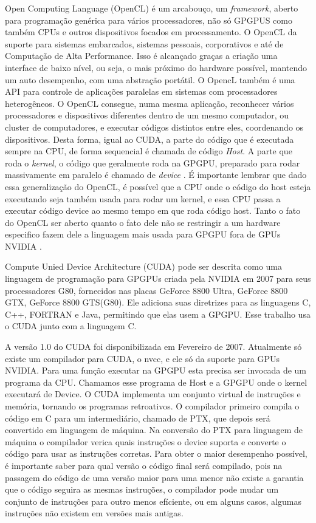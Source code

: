   Open Computing Language (OpenCL) é um arcabouço, um \textit{framework}, aberto para programação genérica para vários processadores, não só GPGPUS como também CPUs e outros dispositivos focados em processamento. O OpenCL da suporte para sistemas embarcados, sistemas pessoais, corporativos e até de Computação de Alta Performance. Isso é alcançado graças a criação uma interface de baixo nível, ou seja, o mais próximo do hardware possível, mantendo um auto desempenho, com uma abstração portátil. O OpencL também é uma API para controle de aplicações paralelas em sistemas com processadores heterogêneos. O OpenCL consegue, numa mesma aplicação, reconhecer vários processadores e dispositivos diferentes dentro de um mesmo computador, ou cluster de computadores, e executar códigos distintos entre eles, coordenando os dispositivos. Desta forma, igual ao CUDA, a parte do código que é executada sempre na CPU, de forma sequencial é chamada de código \textit{Host}. A parte que roda o \textit{kernel}, o código que geralmente roda na GPGPU, preparado para rodar massivamente em paralelo é chamado de \textit{device} . É importante lembrar que dado essa generalização do OpenCL, é possível que a CPU onde o código do host esteja executando seja também usada para rodar um kernel, e essa CPU passa a executar código device ao mesmo tempo em que roda código host. Tanto o fato do OpenCL ser aberto quanto o fato dele não se restringir a um hardware especifico fazem dele a linguagem mais usada para GPGPU fora de GPUs NVIDIA \citep{EDOpencl:11}.

  Compute Unied Device Architecture (CUDA) pode ser descrita como uma linguagem de programação para GPGPUs criada pela NVIDIA em 2007 para seus processadores G80, fornecidos nas placas GeForce 8800 Ultra, GeForce 8800 GTX, GeForce 8800 GTS(G80). Ele adiciona suas diretrizes para as linguagens C, C++, FORTRAN e Java, permitindo que elas usem a GPGPU. Esse trabalho usa o CUDA junto com a linguagem C.

  A versão 1.0 do CUDA foi disponibilizada em Fevereiro de 2007. Atualmente só existe um compilador para CUDA, o nvcc, e ele só da suporte para GPUs NVIDIA. Para uma função executar na GPGPU esta precisa ser invocada de um programa da CPU. Chamamos esse programa de Host e a GPGPU onde o kernel executará de Device. O CUDA implementa um conjunto virtual de instruções e memória, tornando os programas retroativos. O compilador primeiro compila o código em C para um intermediário, chamado de PTX, que depois será convertido em linguagem de máquina. Na conversão do PTX para linguagem de máquina o compilador verica quais instruções o device suporta e converte o código para usar as instruções corretas. Para obter o maior desempenho possível, é importante saber para qual versão o código final será compilado, pois na passagem do código de uma versão maior para uma menor não existe a garantia que o código seguira as mesmas instruções, o compilador pode mudar um conjunto de instruções para outro menos efíciente, ou em alguns casos, algumas instruções não existem em versões mais antigas.

